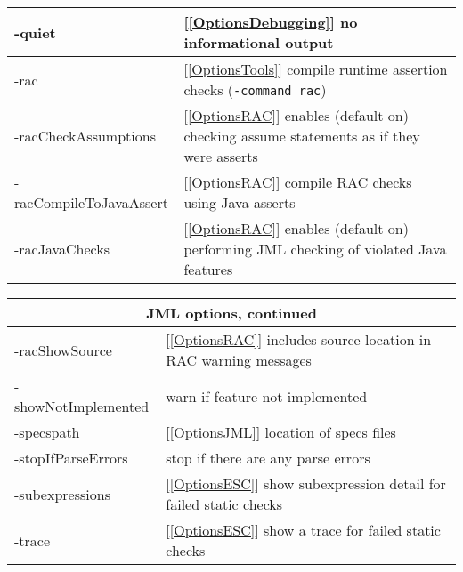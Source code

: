 \begin{table}
{\begin{tabular}{|l|p{1.4in}|}
-quiet & [\ref{OptionsDebugging}] no informational output \\ \hline
-rac & [\ref{OptionsTools}] compile runtime assertion checks ({\tt -command rac})\\ \hline
-racCheckAssumptions & [\ref{OptionsRAC}] enables (default on) checking assume statements as if they were asserts \\ \hline
-racCompileToJavaAssert & [\ref{OptionsRAC}] compile RAC checks using Java asserts \\ \hline
-racJavaChecks & [\ref{OptionsRAC}] enables (default on) performing JML checking of violated Java features \\ \hline
\end{tabular}
}
\qquad
\parbox{.5\textwidth}{

\begin{tabular}{|l|p{1.4in}|}
\hline
\multicolumn{2}{|c|}{JML options, continued} \\
\hline
-racShowSource & [\ref{OptionsRAC}] includes source location in RAC warning messages \\ \hline
-showNotImplemented & warn if feature not implemented\\ \hline
-specspath & [\ref{OptionsJML}] location of specs files\\ \hline
-stopIfParseErrors & stop if there are any parse errors \\ \hline
-subexpressions & [\ref{OptionsESC}] show subexpression detail for failed static checks\\ \hline
-trace & [\ref{OptionsESC}] show a trace for failed static checks\\ \hline

\end{tabular}

\vspace*{.5in}

}
\end{table}
